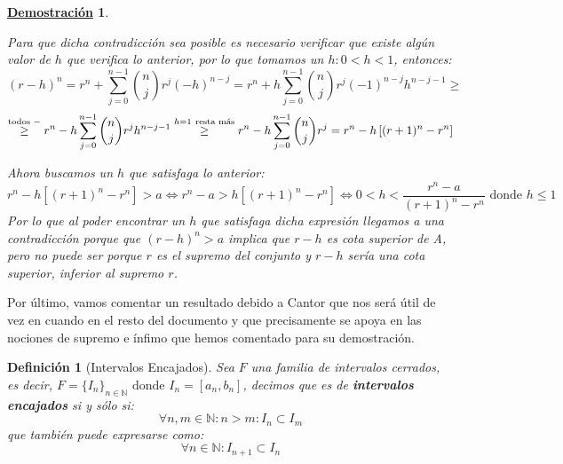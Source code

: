 \documentclass[10pt,a4paper,openright]{book}
\theoremstyle{break}
\newtheorem{defi}{Definición}[chapter]
\newtheorem*{demo}{\underline{Demostración}}
\begin{document}
\begin{demo}
\begin{enumerate}
\begin{itemize}
Para que dicha contradicción sea posible es necesario verificar que existe algún valor de $h$ que verifica lo anterior, por lo que tomamos un $h: 0<h<1$, entonces:
$$(r-h)^n=r^n+\sum_{j=0}^{n-1}\binom{n}{j}r^j(-h)^{n-j}=r^n+h\sum_{j=0}^{n-1}\binom{n}{j}r^j(-1)^{n-j}h^{n-j-1}\geq $$
$$\stackrel{\mbox{\scriptsize{todos }}-}{\geq} r^n-h\sum_{j=0}^{n-1}\binom{n}{j}r^j h^{n-j-1}\stackrel{h=1\mbox{ \scriptsize{resta más}}}{\geq} r^n-h\sum_{j=0}^{n-1}\binom{n}{j}r^j=r^n-h\left[(r+1)^n-r^n\right]$$

Ahora buscamos un $h$ que satisfaga lo anterior:
$$r^n-h\left[(r+1)^n-r^n\right]>a\Leftrightarrow r^n-a>h\left[(r+1)^n-r^n\right]\Leftrightarrow 0<h<\frac{r^n-a}{(r+1)^n-r^n}\mbox{ donde } h\leq 1$$
Por lo que al poder encontrar un $h$ que satisfaga dicha expresión llegamos a una contradicción porque que $(r-h)^n>a$ implica que $r-h$ es cota superior de A, pero no puede ser porque $r$ es el supremo del conjunto y $r-h$ sería una cota superior, inferior al supremo $r$.
\end{itemize}
\end{enumerate}
\end{demo}

Por último, vamos comentar un resultado debido a Cantor que nos será útil de vez en cuando en el resto del documento y que precisamente se apoya en las nociones de supremo e ínfimo que hemos comentado para su demostración.

\begin{defi}[Intervalos Encajados]
Sea $F$ una familia de intervalos cerrados, es decir, $F=\{I_n\}_{n\in \mathbb N}\mbox{ donde }I_n=[a_n,b_n]$, decimos que es de \textbf{intervalos encajados} si y sólo si:
$$ \forall n, m\in \mathbb{N} : n >m : I_n\subset I_m$$
que también puede expresarse como:
$$\forall n\in \mathbb N : I_{n+1}\subset I_{n}$$
\end{defi}
\end{document}
